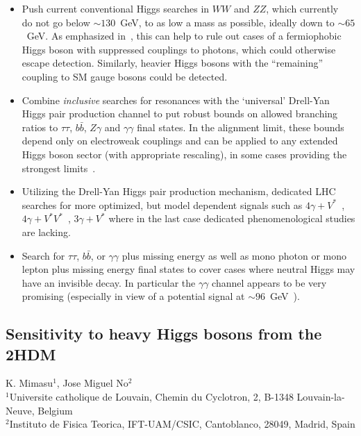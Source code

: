 \documentclass[../report.tex]{subfiles}
\begin{document}
\begin{itemize}
\item Push current conventional Higgs searches in $WW$ and $ZZ$, which
  currently~\cite{Khachatryan:2015cwa,Sirunyan:2018qlb} do not go below
  $\sim 130$~GeV, to as low a mass as possible, ideally down to $\sim
  65$~GeV. As emphasized in~\cite{Delgado:2016arn,Vega:2018ddp}, this
  can help to rule out cases of a fermiophobic Higgs boson with
  suppressed couplings to photons, which could otherwise escape
  detection. Similarly, heavier Higgs bosons with the ``remaining''
  coupling to SM gauge bosons could be detected.

\item Combine \emph{inclusive} searches for resonances with the
  `universal' Drell-Yan Higgs pair production channel to put robust
  bounds on allowed branching ratios to $\tau\tau$, $b\bar{b}$, $Z\gamma$ and
  $\gamma\gamma$ final states. In the alignment limit,
  these bounds depend only on electroweak couplings and can be applied
  to any extended Higgs boson sector (with appropriate rescaling), in
  some cases providing the strongest limits~\cite{Delgado:2016arn,Vega:2018ddp}.

\item Utilizing the Drell-Yan Higgs pair production mechanism, dedicated
  LHC searches for more optimized, but model dependent signals such as
  $4\gamma + V^\ast$~\cite{Akeroyd:2003bt,Aaltonen:2016fnw,Arhrib:2017wmo},
  $4\gamma + V^\ast V^\ast$~\cite{Akeroyd:2003bt}, $3\gamma +
  V^\ast$ where in the last case dedicated phenomenological studies are
  lacking. 

\item Search for $\tau\tau$, $b\bar{b}$, or $\gamma\gamma$ plus missing
  energy as well as mono photon or mono lepton plus missing energy final
  states to cover cases where neutral Higgs may have an invisible
  decay. In particular the $\gamma\gamma$ channel appears to be
  very promising (especially in view of a potential signal at 
  $\sim 96$~GeV~\cite{CMS-PAS-HIG-17-013}).
 
\end{itemize}




\subsection{Sensitivity to heavy Higgs bosons from the 2HDM}

\begin{center}
 {K. Mimasu$^{1}$, Jose Miguel No$^{2}$ \\
}
 {\small $^{1}$Universite catholique de Louvain, Chemin du Cyclotron, 2, B-1348 Louvain-la-Neuve, Belgium \\
 $^{2}$Instituto de Fisica Teorica, IFT-UAM/CSIC, Cantoblanco, 28049, Madrid, Spain}
\end{center}
\end{document}
